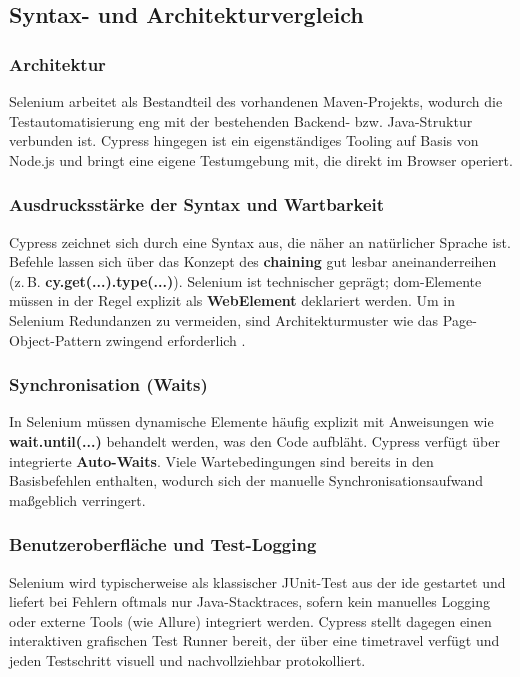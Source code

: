 \subsection{Syntax- und Architekturvergleich}
\label{sec:syntaxvergleich}

\subsubsection{Architektur}
Selenium arbeitet als Bestandteil des vorhandenen Maven-Projekts, wodurch die Testautomatisierung eng mit der bestehenden Backend- bzw. Java-Struktur verbunden ist. Cypress hingegen ist ein eigenständiges Tooling auf Basis von Node.js und bringt eine eigene Testumgebung mit, die direkt im Browser operiert.

\subsubsection{Ausdrucksstärke der Syntax und Wartbarkeit}
Cypress zeichnet sich durch eine Syntax aus, die näher an natürlicher Sprache ist. Befehle lassen sich über das Konzept des \textbf{\gls{chaining}} gut lesbar aneinanderreihen (z.\,B. \textbf{cy.get(...).type(...)}). Selenium ist technischer geprägt; \gls{dom}-Elemente müssen in der Regel explizit als \textbf{WebElement} deklariert werden. Um in Selenium Redundanzen zu vermeiden, sind Architekturmuster wie das Page-Object-Pattern zwingend erforderlich \cite{Liggesmeyer2009}.

\subsubsection{Synchronisation (Waits)}
In Selenium müssen dynamische Elemente häufig explizit mit Anweisungen wie \textbf{wait.until(...)} behandelt werden, was den Code aufbläht. 
Cypress verfügt über integrierte \textbf{Auto-Waits}. 
Viele Wartebedingungen sind bereits in den Basisbefehlen enthalten, wodurch sich der manuelle Synchronisationsaufwand maßgeblich verringert.

\subsubsection{Benutzeroberfläche und Test-Logging}
Selenium wird typischerweise als klassischer JUnit-Test aus der \gls{ide} gestartet und liefert bei Fehlern oftmals nur Java-Stacktraces, sofern kein manuelles Logging oder externe Tools (wie Allure) integriert werden. Cypress stellt dagegen einen interaktiven grafischen Test Runner bereit, der über eine \gls{timetravel} verfügt und jeden Testschritt visuell und nachvollziehbar protokolliert.

